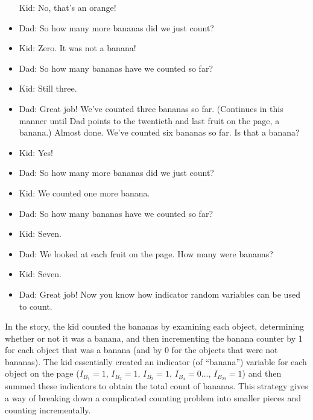 \documentclass[
  letterpaper,
  DIV=11,
  numbers=noendperiod]{scrreprt}
\theoremstyle{plain}
\theoremstyle{definition}
\theoremstyle{definition}
\theoremstyle{definition}
\theoremstyle{remark}
\begin{document}
\begin{itemize}
  Kid: No, that's an orange!
\item
  Dad: So how many more bananas did we just count?
\item
  Kid: Zero. It was not a banana!
\item
  Dad: So how many bananas have we counted so far?
\item
  Kid: Still three.
\item
  Dad: Great job! We've counted three bananas so far. (Continues in this
  manner until Dad points to the twentieth and last fruit on the page, a
  banana.) Almost done. We've counted six bananas so far. Is that a
  banana?
\item
  Kid: Yes!
\item
  Dad: So how many more bananas did we just count?
\item
  Kid: We counted one more banana.
\item
  Dad: So how many bananas have we counted so far?
\item
  Kid: Seven.
\item
  Dad: We looked at each fruit on the page. How many were bananas?
\item
  Kid: Seven.
\item
  Dad: Great job! Now you know how indicator random variables can be
  used to count.
\end{itemize}

In the story, the kid counted the bananas by examining each object,
determining whether or not it was a banana, and then incrementing the
banana counter by 1 for each object that was a banana (and by 0 for the
objects that were not bananas). The kid essentially created an indicator
(of ``banana'') variable for each object on the page (\(I_{B_1}=1\),
\(I_{B_2}=1\), \(I_{B_3}=1\), \(I_{B_4}=0\ldots\), \(I_{B_{20}}=1\)) and
then summed these indicators to obtain the total count of bananas. This
strategy gives a way of breaking down a complicated counting problem
into smaller pieces and counting incrementally.
\end{document}
